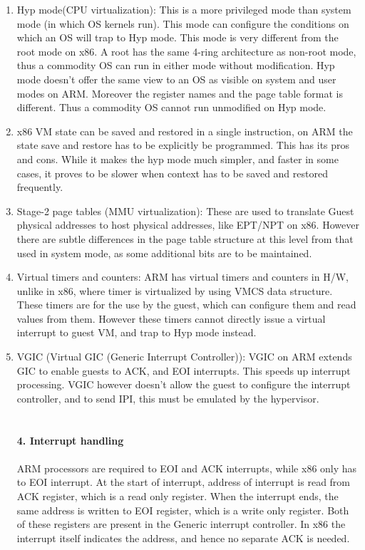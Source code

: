 \documentclass[seminar,twoside]{iitbreport}
\begin{document}
\begin{enumerate}
\item Hyp mode(CPU virtualization): This is a more privileged mode than system mode (in which OS kernels run). This mode can configure the conditions on which an OS will trap to Hyp mode. This mode is very different from the root mode on x86. A root has the same 4-ring architecture as non-root mode, thus a commodity OS can run in either mode without modification. Hyp mode doesn't offer the same view to an OS as visible on system and user modes on ARM. Moreover the register names and the page table format is different. Thus a commodity OS cannot run unmodified on Hyp mode.

\item x86 VM state can be saved and restored in a single instruction, on ARM the state save and restore has to be explicitly be programmed. This has its pros and cons. While it makes the hyp mode much simpler, and faster in some cases, it proves to be slower when context has to be saved and restored frequently.

\item Stage-2 page tables (MMU virtualization): These are used to translate Guest physical addresses to host physical addresses, like EPT/NPT on x86. However there are subtle differences in the page table structure at this level from that used in system mode, as some additional bits are to be maintained.

\item Virtual timers and counters: ARM has virtual timers and counters in H/W, unlike in x86, where timer is virtualized by using VMCS data structure. These timers are for the use by the guest, which can configure them and read values from them. However these timers cannot directly issue a virtual interrupt to guest VM, and trap to Hyp mode instead.

\item VGIC (Virtual GIC (Generic Interrupt Controller)): VGIC on ARM extends GIC to enable guests to ACK, and EOI interrupts. This speeds up interrupt processing. VGIC however doesn't allow the guest to configure the interrupt controller, and to send IPI, this must be emulated by the hypervisor.
\\\\\\

\textbf{4. Interrupt handling}
\\\\
ARM processors are required to EOI and ACK interrupts, while x86 only has to EOI interrupt. At the start of interrupt, address of interrupt is read from ACK register, which is a read only register. When the interrupt ends, the same address is written to EOI register, which is a write only register. Both of these registers are present in the Generic interrupt controller. In x86 the interrupt itself indicates the address, and hence no separate ACK is needed.
\end{enumerate}
\end{document}
